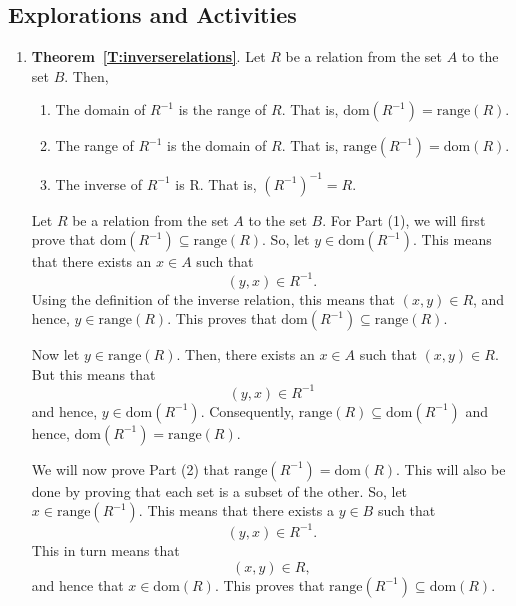 \subsection*{Explorations and Activities}
\setcounter{oldenumi}{\theenumi}
\begin{enumerate} \setcounter{enumi}{\theoldenumi}
\item \noindent
\textbf{Theorem~\ref{T:inverserelations}}.  Let  $R$  be a relation from the set  $A$  to the set  $B$.  Then,
\begin{enumerate}
\item The domain of  $R^{ - 1} $ is the range of  $R$.  That is, 
$\text{dom}\left( {R^{ - 1} } \right) = \text{range}\left( R \right)$.

\item The range of  $R^{ - 1} $  is the domain of  $R$.   That is, 
$\text{range}\left( {R^{ - 1} } \right) = \text{dom}\left( R \right)$.

\item The inverse of  $R^{ - 1} $  is  R.  That is, $\left( {R^{ - 1} } \right)^{ - 1}  = R$.
\end{enumerate}

\begin{myproof}
Let  $R$  be a relation from the set  $A$  to the set  $B$.  For Part (1), we will first prove that  $\text{dom}\left( {R^{ - 1} } \right) \subseteq \text{range}\left( R \right)$.  So, let  
$y \in \text{dom}\left( {R^{ - 1} } \right)$.  This means that there exists an  $x \in A$ such that
\[
\left( {y, x} \right) \in R^{ - 1}.
\]
Using the definition of the inverse relation, this means that  $\left( {x, y} \right) \in R$, and hence,  $y \in \text{range}\left( R \right)$.  This proves that  
$\text{dom}\left( {R^{ - 1} } \right) \subseteq \text{range}\left( R \right)$.

Now let  $y \in \text{range}\left( R \right)$.  Then, there exists an  $x \in A$ such that  
$\left( {x, y} \right) \in R$.  But this means that  
\[
\left( {y, x} \right) \in R^{ - 1} 
\]
and hence,  $y \in \text{dom}\left( {R^{ - 1} } \right)$.  Consequently,  
$\text{range}\left( R \right) \subseteq \text{dom}\left( {R^{ - 1} } \right)$ and hence, 
$\text{dom}\left( {R^{ - 1} } \right) = \text{range}\left( R \right)$.
\vskip6pt

We will now prove Part (2) that  
$\text{range}\left( {R^{ - 1} } \right) = \text{dom}\left( R \right)$.  This will also be done by proving that each set is a subset of the other.  So, let  
$x \in \text{range}\left( {R^{ - 1} } \right)$. This means that there exists a  $y \in B$ such that  
\[
\left( {y, x} \right) \in R^{ - 1}.
\]
This in turn means that
\[
\left( {x, y} \right) \in R,
\]
and hence that  $x \in \text{dom}\left( R \right)$.  This proves that  
$\text{range}\left( {R^{ - 1} } \right) \subseteq \text{dom}\left( R \right)$. 


\end{myproof}
\end{enumerate}
